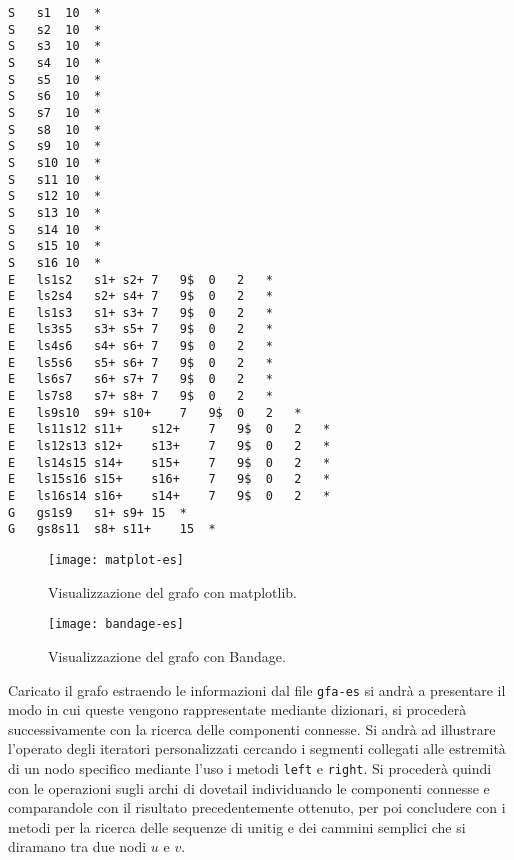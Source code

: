 \captionsetup{justification=centering, singlelinecheck=false}
\begin{minipage}{\linewidth}
\begin{lstlisting}[basicstyle=\ttfamily\scriptsize, frame=topline, label={code:gfa-es}, caption=Il file GFA2 usato per l'esempio.]
S	s1	10	*
S	s2	10	*
S	s3	10	*
S	s4	10	*
S	s5	10	*
S	s6	10	*
S	s7	10	*
S	s8	10	*
S	s9	10	*
S	s10	10	*
S	s11	10	*
S	s12	10	*
S	s13	10	*
S	s14	10	*
S	s15	10	*
S	s16	10	*
E	ls1s2	s1+	s2+	7	9$	0	2	*
E	ls2s4	s2+	s4+	7	9$	0	2	*
E	ls1s3	s1+	s3+	7	9$	0	2	*
E	ls3s5	s3+	s5+	7	9$	0	2	*
E	ls4s6	s4+	s6+	7	9$	0	2	*
E	ls5s6	s5+	s6+	7	9$	0	2	*
E	ls6s7	s6+	s7+	7	9$	0	2	*
E	ls7s8	s7+	s8+	7	9$	0	2	*
E	ls9s10	s9+	s10+	7	9$	0	2	*
E	ls11s12	s11+	s12+	7	9$	0	2	*
E	ls12s13	s12+	s13+	7	9$	0	2	*
E	ls14s15	s14+	s15+	7	9$	0	2	*
E	ls15s16	s15+	s16+	7	9$	0	2	*
E	ls16s14	s16+	s14+	7	9$	0	2	*
G	gs1s9	s1+	s9+	15	*
G	gs8s11	s8+	s11+	15	*
\end{lstlisting}
\end{minipage}
\captionsetup{justification=justified, singlelinecheck=false}

\captionsetup{justification=centering, singlelinecheck=false}
\begin{figure}
	\texttt{[image: matplot-es]}
	\caption{Visualizzazione del grafo con matplotlib.}
	\label{fig:plot-matplot}
	\vspace{1cm}
	\texttt{[image: bandage-es]}
	\caption{Visualizzazione del grafo con Bandage.}
	\label{fig:plot-bandage}
\end{figure}
\captionsetup{justification=justified, singlelinecheck=false}

Caricato il grafo estraendo le informazioni dal file \texttt{gfa-es}
si andrà a presentare il modo in cui queste vengono rappresentate
mediante dizionari, si procederà successivamente
con la ricerca delle componenti connesse.
Si andrà ad illustrare l'operato degli iteratori personalizzati
cercando i segmenti collegati alle estremità di un nodo
specifico mediante l'uso i metodi \texttt{left} e \texttt{right}.
Si procederà quindi con le operazioni sugli archi di dovetail
individuando le componenti connesse e comparandole
con il risultato precedentemente ottenuto, per
poi concludere con i metodi per la ricerca
delle sequenze di unitig e dei cammini semplici
che si diramano tra due nodi $u$ e $v$.

